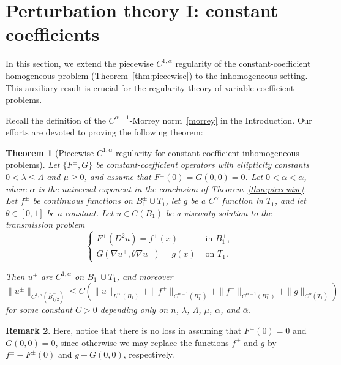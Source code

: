 \documentclass[letter,11pt]{amsart}
\newtheorem{thm}{Theorem}[section]
\theoremstyle{definition}
\newtheorem{rem}[thm]{Remark}
\numberwithin{equation}{section}
\begin{document}
\medskip


\section{Perturbation theory I: constant coefficients}
\label{sec:inhom}

In this section, we extend the piecewise $C^{1,\overline{\alpha}}$ regularity of the constant-coefficient homogeneous problem (Theorem~\ref{thm:piecewise}) to the inhomogeneous setting.
This auxiliary result is crucial for the regularity theory of variable-coefficient problems.

\medskip

Recall the definition of the $C^{\alpha-1}$-Morrey norm~\eqref{morrey} in the Introduction.
Our efforts are devoted to proving the following theorem:

\begin{thm}
[Piecewise $C^{1,\alpha}$ regularity for constant-coefficient inhomogeneous problems]
\label{thm:const}
Let $\{F^{\pm}, G\}$ be constant-coefficient operators with ellipticity constants $0 < \lambda \leq \Lambda$ and $\mu \geq 0$, and assume that $F^{\pm}(0) = G(0,0) = 0$.
Let $0 < \alpha < \overline{\alpha}$, where $\overline{\alpha}$ is the universal exponent in the conclusion of Theorem~\ref{thm:piecewise}.
Let $f^{\pm}$ be continuous functions on $B_1^{\pm} \cup T_1$, let $g$ be a $C^{\alpha}$ function in $T_1$, and let $\theta \in [0,1]$ be a constant.
Let $u \in C(B_1)$ be a viscosity solution to the transmission problem
\[
\begin{cases}
F^{\pm}(D^2 u) = f^{\pm}(x) & \text{ in } B_{1}^{\pm},\\
G(\nabla u^{+}, \theta \nabla u^{-}) = g(x) &\text{ on } T_{1}.
\end{cases}
\]

Then $u^{\pm}$ are $C^{1,\alpha}$ on $B_1^{\pm} \cup T_1$, and moreover
\[
\|u^{\pm}\|_{C^{1,\alpha}(\overline{B}_{1/2}^{\pm})} \leq C \left( \|u\|_{L^{\infty}(B_1)} 
+ \|f^{+}\|_{C^{\alpha-1}(B_1^{+})} 
+ \|f^{-}\|_{C^{\alpha-1}(B_1^{-})} 
+ \|g\|_{C^{\alpha}(\overline{T}_1)}
\right)
\]
for some constant $C > 0$ depending only on $n$, $\lambda$, $\Lambda$, $\mu$, $\alpha$, and $\overline{\alpha}$.
\end{thm}

\begin{rem}
Here, notice that there is no loss in assuming that $F^{\pm}(0) = 0$ and $G(0,0) = 0$, since otherwise we may replace the functions $f^{\pm}$ and $g$ by $f^{\pm} - F^{\pm}(0)$ and $g - G(0,0)$, respectively.
\end{rem}
\end{document}
